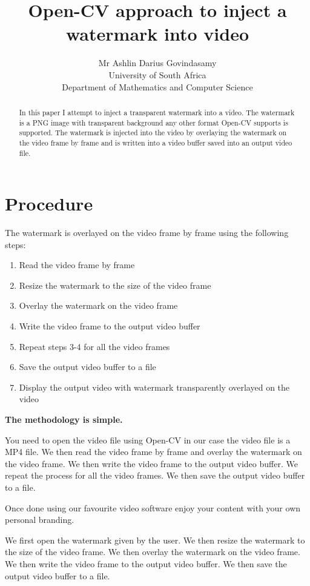 \documentclass[ebook,12pt,oneside,openany]{memoir}
\title{Open-CV approach to inject a watermark into video}
\author{Mr Ashlin Darius Govindasamy \\ \large{University of South Africa} \\ \small{Department of Mathematics and Computer Science}}
\begin{document}
\maketitle

\newpage

\begin{abstract}
In this paper I attempt to inject a transparent watermark into a video. The watermark is a PNG image with transparent background any other format Open-CV supports is supported. The watermark is injected into the video by overlaying the watermark on the video frame by frame and is written into a video buffer saved into an output video file.
\end{abstract}

\newpage
\tableofcontents
\newpage

\chapter{Procedure}
The watermark is overlayed on the video frame by frame using the following steps:
\begin{enumerate}
\item Read the video frame by frame
\item Resize the watermark to the size of the video frame
\item Overlay the watermark on the video frame
\item Write the video frame to the output video buffer
\item Repeat steps 3-4 for all the video frames
\item Save the output video buffer to a file
\item Display the output video with watermark transparently overlayed on the video
\end{enumerate}

\textbf{The methodology is simple.}

You need to open the video file using Open-CV in our case the video file is a MP4 file. We then read the video frame by frame and overlay the watermark on the video frame. We then write the video frame to the output video buffer. We repeat the process for all the video frames. We then save the output video buffer to a file. 

Once done using our favourite video software enjoy your content with your own personal branding.

We first open the watermark given by the user. We then resize the watermark to the size of the video frame. We then overlay the watermark on the video frame. We then write the video frame to the output video buffer. We then save the output video buffer to a file.
\end{document}
